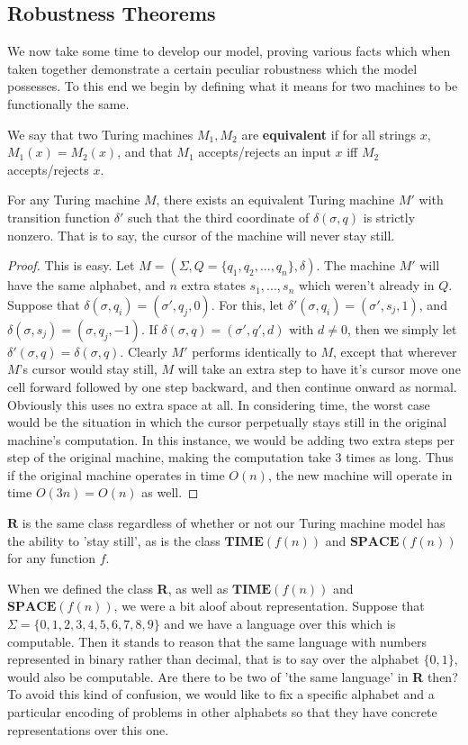 \subsection{Robustness Theorems}
We now take some time to develop our model, proving various facts which when taken together demonstrate a certain peculiar robustness which the model possesses. To this end we begin by defining what it means for two machines to be functionally the same.
\begin{definition}
	We say that two Turing machines $M_1,M_2$ are \textbf{equivalent} if for all strings $x$, $M_1(x) = M_2(x)$, and that $M_1$ accepts/rejects an input $x$ iff $M_2$ accepts/rejects $x$. 
\end{definition} 
\begin{lemma}
	For any Turing machine $M$, there exists an equivalent Turing machine $M'$ with transition function $\delta'$ such that the third coordinate of $\delta(\sigma,q)$ is strictly nonzero. That is to say, the cursor of the machine will never stay still.
\end{lemma}
\begin{proof}
	This is easy. Let $M = (\Sigma,Q = \{q_1,q_2,...,q_n\},\delta)$. The machine $M'$ will have the same alphabet, and $n$ extra states $s_1,...,s_n$ which weren't already in $Q$. Suppose that $\delta(\sigma,q_i) = (\sigma',q_j,0)$. For this, let $\delta'(\sigma,q_i) = (\sigma',s_j,1)$, and $\delta(\sigma,s_j) = (\sigma,q_j,-1)$. If $\delta(\sigma,q) = (\sigma',q',d)$ with $d \neq 0$, then we simply let $\delta'(\sigma,q) = \delta(\sigma,q)$. Clearly $M'$ performs identically to $M$, except that wherever $M$'s cursor would stay still, $M$ will take an extra step to have it's cursor move one cell forward followed by one step backward, and then continue onward as normal. Obviously this uses no extra space at all. In considering time, the worst case would be the situation in which the cursor perpetually stays still in the original machine's computation. In this instance, we would be adding two extra steps per step of the original machine, making the computation take $3$ times as long. Thus if the original machine operates in time $O(n)$, the new machine will operate in time $O(3n) = O(n)$ as well. 
\end{proof}
\begin{corollary}
	$\bm{R}$ is the same class regardless of whether or not our Turing machine model has the ability to 'stay still', as is the class $\bm{TIME}(f(n))$ and $\bm{SPACE}(f(n))$ for any function $f$. 
\end{corollary}
When we defined the class \textbf{R}, as well as $\bm{TIME}(f(n))$ and $\bm{SPACE}(f(n))$, we were a bit aloof about representation. Suppose that $\Sigma = \{0,1,2,3,4,5,6,7,8,9\}$ and we have a language over this which is computable. Then it stands to reason that the same language with numbers represented in binary rather than decimal, that is to say over the alphabet $\{0,1\}$, would also be computable. Are there to be two of 'the same language' in \textbf{R} then? To avoid this kind of confusion, we would like to fix a specific alphabet and a particular encoding of problems in other alphabets so that they have concrete representations over this one.

